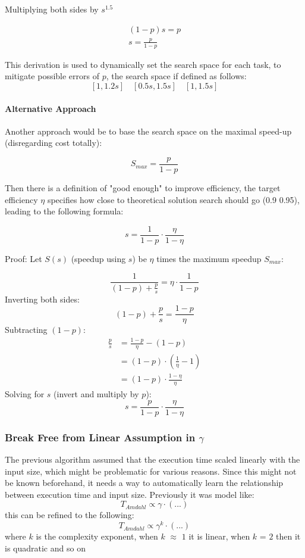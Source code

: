 \documentclass[a4paper, 12pt]{article}
\begin{document}
	 Multiplying both sides by $s^{1.5}$
	 
	 \begin{align*}
	 	(1-p)s = p \\[7pt]
	 	s = \frac{p}{1-p}
	 \end{align*}
	 
	 This derivation is used to dynamically set the search space for each task, to mitigate possible errors of $p$, the search space if defined as follows:
	 \[
	 [1, 1.2s] \quad [0.5s, 1.5s] \quad [1, 1.5s]
	 \]
	 
	 \paragraph*{Alternative Approach}
	 Another approach would be to base the search space on the maximal speed-up (disregarding cost totally):
	 
	 \[
	 S_{max} = \frac{p}{1-p}
	 \]
	
	Then there is a definition of "good enough" to improve efficiency, the target efficiency $\eta$ specifies how close to theoretical solution search should go (0.9 0.95), leading to the following formula:
	
	\[
	s = \frac{1}{1-p} \cdot \frac{\eta}{1 - \eta}
	\]
	
	Proof:
	Let $S(s)$ (speedup using $s$) be $\eta$ times the maximum speedup $S_{max}$:
	
	\[
	\frac{1}{(1-p) + \frac{p}{s}} = \eta \cdot \frac{1}{1-p}
	\]
	Inverting both sides:
	\[
	(1-p) + \frac{p}{s} = \frac{1-p}{\eta}
	\]
	Subtracting $(1-p)$:
	\begin{align*}
		\frac{p}{s} &= \frac{1-p}{\eta} - (1-p) \\
		&= (1-p) \cdot \left(\frac{1}{\eta} -1\right) \\
		&= (1-p) \cdot \frac{1-\eta}{\eta}
	\end{align*}
	Solving for $s$ (invert and multiply by $p$):
	\[
	s = \frac{p}{1-p} \cdot \frac{\eta}{1 - \eta}
	\]
	
	\subsubsection*{Break Free from Linear Assumption in $\gamma$}
	The previous algorithm assumed that the execution time scaled linearly with the input size, which might be problematic for various reasons. Since this might not be known beforehand, it needs a way to automatically learn the relationship between execution time and input size. Previously it was model like:
	\[
	T_{Amdahl} \propto \gamma \cdot (...)
	\]
	this can be refined to the following:
	\[
	T_{Amdahl} \propto \gamma^k \cdot (...)
	\]
	where $k$ is the complexity exponent, when $k$ $\approx$ $1$ it is linear, when $k$ = $2$ then it is quadratic and so on
	
\end{document}
